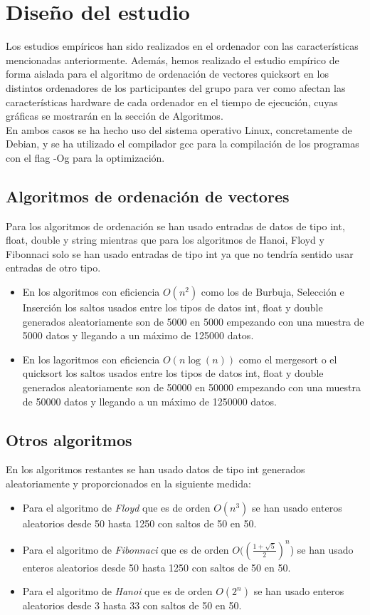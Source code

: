 \documentclass[11pt]{article}
\begin{document}
\section{Diseño del estudio}

    Los estudios empíricos han sido realizados en el ordenador con las características mencionadas anteriormente.
    Además, hemos realizado el estudio empírico de forma aislada para el algoritmo de ordenación de vectores
    quicksort en los distintos ordenadores de los participantes del grupo para ver como afectan las características
    hardware de cada ordenador en el tiempo de ejecución, cuyas gráficas se mostrarán en la sección de Algoritmos. \\
    En ambos casos se ha hecho uso del sistema operativo Linux, concretamente de Debian, y se ha utilizado el
    compilador gcc para la compilación de los programas  con el flag -Og para la optimización.
    \subsection{Algoritmos de ordenación de vectores}
    Para los algoritmos de ordenación se han usado entradas de datos de tipo int, float, double y string mientras que para los algoritmos de Hanoi, Floyd  y Fibonnaci solo se han usado entradas de tipo int 
    ya que no tendría sentido usar entradas de otro tipo. 
    \begin{itemize}
        \item En los algoritmos con eficiencia  \(O(n^2)\) como los de Burbuja, Selección e Inserción los saltos usados entre los tipos de datos int, float y double generados aleatoriamente son de 5000 en 5000 empezando con una muestra de 5000 datos y llegando a
        un máximo de 125000 datos.
        \item En los lagoritmos con eficiencia \(O (n\log(n))\) como el mergesort o el quicksort los saltos usados entre los tipos de datos int, float y double generados aleatoriamente son de 50000 en 50000 empezando con una muestra de 50000 datos y llegando a
        un máximo de 1250000 datos.
    \end{itemize}

    \subsection{Otros algoritmos}
    En los algoritmos restantes se han usado datos de tipo int generados aleatoriamente y proporcionados en la siguiente medida:
    \begin{itemize}
        \item Para el algoritmo de \textit{Floyd}  que es de orden \(O(n^3)\) se han usado enteros aleatorios desde 50 hasta 1250 con saltos de 50 en 50.
        \item Para el algoritmo de \textit{Fibonnaci}  que es de orden \(O((\frac{1+\sqrt{5}}{2})^n\)) se han usado enteros aleatorios desde 50 hasta 1250 con saltos de 50 en 50.
        \item Para el algoritmo de \textit{Hanoi} que es de orden \(O(2^n)\) se han usado enteros aleatorios desde 3 hasta 33 con saltos de 50 en 50. 
    \end{itemize}
\end{document}
